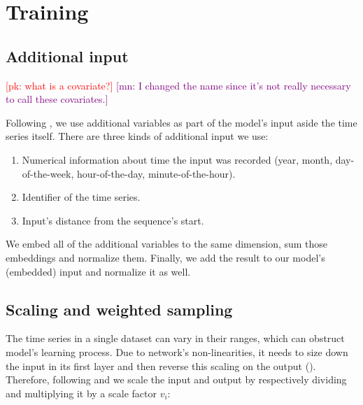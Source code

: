 \documentclass[en]{pracamgr}
\newcommand{\pk}[1]{\textcolor{red}{\small [pk: #1]}}
\newcommand{\mn}[1]{\textcolor{purple}{\small [mn: #1]}}
\begin{document}
\section{Training}

\subsection{Additional input} \pk{what is a covariate?} \mn{I changed the name since it's not really necessary to call these covariates.}

Following \cite{enhancing}, we use additional variables as part of the model's input aside the time series itself.
There are three kinds of additional input we use:
\begin{enumerate}
	\item Numerical information about time the input was recorded (year, month, day-of-the-week, hour-of-the-day, minute-of-the-hour). 
	\item Identifier of the time series.
	\item Input's distance from the sequence's start. 
\end{enumerate}
We embed all of the additional variables to the same dimension, sum those embeddings and normalize them. Finally, we add the result to our model's (embedded) input and normalize it as well.


\subsection{Scaling and weighted sampling}\label{s:scale}

The time series in a single dataset can vary in their ranges, which can obstruct model's learning process. Due to network's non-linearities, it needs to size down the input in its first layer and then reverse this scaling on the output (\cite{deepar}). Therefore, following \cite{enhancing} and \cite{deepar} we scale the input and output by respectively dividing and multiplying it by a scale factor $v_i$:
\end{document}
